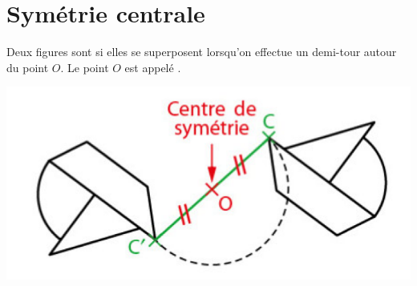 \documentclass[xcolor={dvipsnames}]{beamer}
\begin{document}
\section{Symétrie centrale}

\begin{frame}
	\begin{mydef}
		
		Deux figures sont  si elles se superposent lorsqu'on effectue un demi-tour autour du point $O$. Le point $O$ est appelé .\pause
		
	\end{mydef}
	
	\begin{myex}
		\begin{center}
			\includegraphics[scale=.5]{fig2}
		\end{center}
	\end{myex}
\end{frame}
\end{document}
